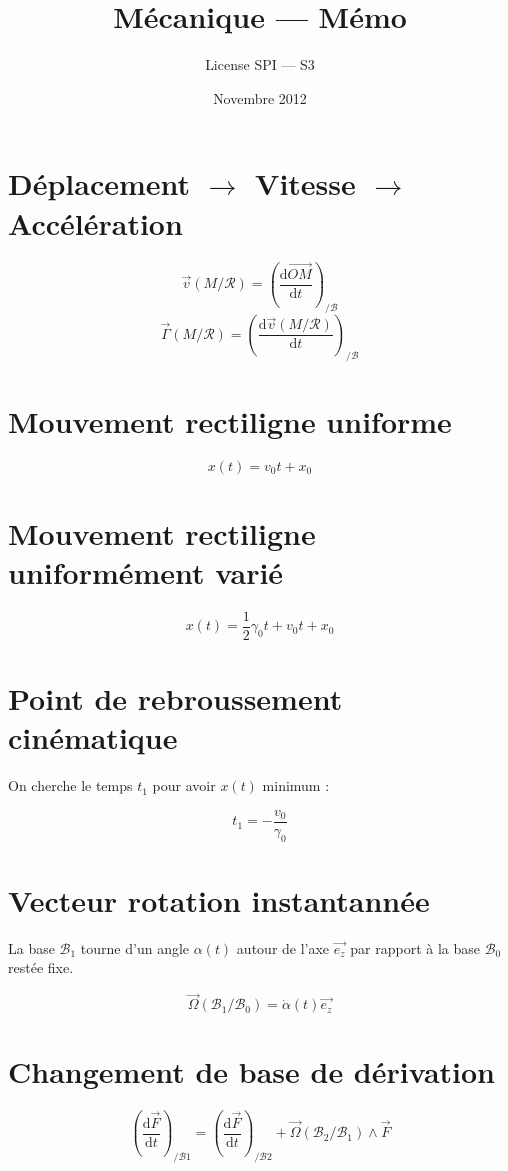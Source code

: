 \documentclass[a4paper, 11pt]{article}
\title{Mécanique — Mémo}
\author{License SPI — S3}
\date{Novembre 2012}
\newcommand{\V}{\overrightarrow}
\newcommand{\R}{\mathcal{R}}
\newcommand{\B}{\mathcal{B}}
\newcommand{\D}{\mathrm{d}}
\begin{document}
    \maketitle

\section{Déplacement $\rightarrow$ Vitesse $\rightarrow$ Accélération}

$$\V{v}(M/\R) = \left(\frac{\D\V{OM}}{\D t}\right)_{/\B}$$
$$\V{\Gamma}(M/\R) = \left(\frac{\D\V{v}(M/\R)}{\D t}\right)_{/\B}$$

\section{Mouvement rectiligne uniforme}

$$x(t) = v_0t + x_0$$

\section{Mouvement rectiligne uniformément varié}

$$x(t) = \frac{1}{2}\gamma_0t + v_0t + x_0$$

\section{Point de rebroussement cinématique}

On cherche le temps $t_1$ pour avoir $x(t)$ minimum :

$$t_1 = -\frac{v_0}{\gamma_0}$$

\section{Vecteur rotation instantannée}

La base $\B_1$ tourne d'un angle $\alpha(t)$ autour de l'axe $\V{e_z}$ par rapport à la base $\B_0$ restée fixe.

$$\V{\Omega}(\B_1/\B_0) = \dot{\alpha}(t)\V{e_z}$$

\section{Changement de base de dérivation}

$$\left(\frac{\D\V{F}}{\D t}\right)_{/\B1} =  \left(\frac{\D\V{F}}{\D t}\right)_{/\B2} + \V{\Omega}(\B_2/\B_1)\wedge\V{F}$$
\end{document}
